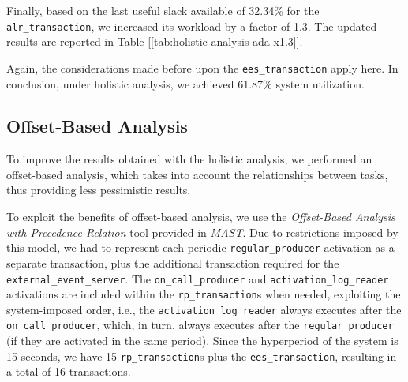 Finally, based on the last useful slack available of 32.34\% for the
\texttt{alr\_transaction}, we increased its workload by a factor of 1.3. The
updated results are reported in Table [\ref{tab:holistic-analysis-ada-x1.3}].

\begin{table}[H]
  \caption{Holistic Analysis Results Ada x1.3}
  \label{tab:holistic-analysis-ada-x1.3}
\end{table}

Again, the considerations made before upon the \texttt{ees\_transaction} apply
here. In conclusion, under holistic analysis, we achieved 61.87\% system utilization. 

\subsection{Offset-Based Analysis}
To improve the results obtained with the holistic analysis, we performed an
offset-based analysis, which takes into account the relationships between tasks,
thus providing less pessimistic results.

To exploit the benefits of offset-based analysis, we use the \textit{Offset-Based Analysis
with Precedence Relation} tool provided in \textit{MAST}. Due to restrictions
imposed by this model, we had to represent each periodic
\texttt{regular\_producer} activation as a separate transaction, plus the
additional transaction required for the \texttt{external\_event\_server}. The
\texttt{on\_call\_producer} and \texttt{activation\_log\_reader} activations are
included within the \texttt{rp\_transaction}s when needed, exploiting the
system-imposed order, i.e., the \texttt{activation\_log\_reader} always
executes after the \texttt{on\_call\_producer}, which, in turn, always executes
after the \texttt{regular\_producer} (if they are activated in the same period).
Since the hyperperiod of the system is 15 seconds, we have 15
\texttt{rp\_transaction}s plus the \texttt{ees\_transaction}, resulting in a
total of 16 transactions.

